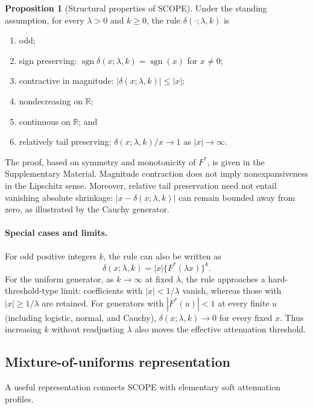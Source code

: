 \documentclass[12pt]{article}
\theoremstyle{definition}
\newtheorem{proposition}{Proposition}
\theoremstyle{definition}
\DeclareMathOperator{\sgn}{sgn}
\newcommand{\R}{\mathbb{R}}
\begin{document}
\begin{proposition}[Structural properties of SCOPE]
\label{prop:one}
Under the standing assumption, for every $\lambda>0$ and $k\ge0$, the
rule $\delta(\cdot;\lambda,k)$ is
\begin{enumerate}
\item[(a)] odd;
\item[(b)] sign preserving: $\sgn\delta(x;\lambda,k)=\sgn(x)$ for $x\ne0$;
\item[(c)] contractive in magnitude: $|\delta(x;\lambda,k)|\le|x|$;
\item[(d)] nondecreasing on $\R$;
\item[(e)] continuous on $\R$; and
\item[(f)] relatively tail preserving: $\delta(x;\lambda,k)/x\to1$ as
$|x|\to\infty$.
\end{enumerate}
\end{proposition}

The proof, based on symmetry and monotonicity of $F^*$, is given in
the Supplementary Material. Magnitude contraction does not imply
nonexpansiveness in the Lipschitz sense. Moreover, relative tail
preservation need not entail vanishing absolute shrinkage:
$|x-\delta(x;\lambda,k)|$ can remain bounded away from zero, as
illustrated by the Cauchy generator.

\paragraph{Special cases and limits.}
For odd positive integers $k$, the rule can also be written as
\begin{equation}
\delta(x;\lambda,k)=|x|\{F^*(\lambda x)\}^k.
\label{eq:scope_oddk}
\end{equation}
For the uniform generator, as $k\to\infty$ at fixed $\lambda$,
the rule approaches a hard-threshold-type limit: coefficients with
$|x|<1/\lambda$ vanish, whereas those with
$|x|\ge 1/\lambda$ are retained. For generators with
$|F^*(u)|<1$ at every finite $u$ (including logistic, normal, and
Cauchy), $\delta(x;\lambda,k)\to0$ for every fixed $x$.
Thus increasing $k$ without readjusting $\lambda$ also moves the
effective attenuation threshold.

\subsection{Mixture-of-uniforms representation}

A useful representation connects SCOPE with elementary soft
attenuation profiles.
\end{document}
